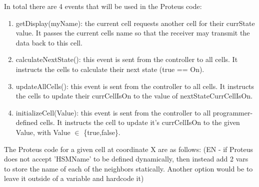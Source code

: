 In total there are 4 events that will be used in the Proteus code:
\begin{enumerate}
    \item getDisplay(myName): the current cell requests another cell for their currState value.
    It passes the current cells name so that the receiver may transmit the data back to this cell.
    \item calculateNextState(): this event is sent from the controller to all cells.
    It instructs the cells to calculate their next state (true == On).
    \item updateAllCells(): this event is sent from the controller to all cells.
    It instructs the cells to update their currCellIsOn to the value of nextStateCurrCellIsOn.
    \item initializeCell(Value): this event is sent from the controller to all programmer-defined cells.
    It instructs the cell to update it's currCellIsOn to the given Value, with Value $\in$ \{true,false\}.
\end{enumerate}

The Proteus code for a given cell at coordinate X are as follows:
(EN - if Proteus does not accept 'HSMName' to be defined dynamically, then instead add 2 vars to store the name of each of the neighbors statically. Another option would be to leave it outside of a variable and hardcode it)

